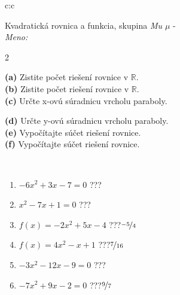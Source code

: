 \documentclass[10pt]{report}
\begin{document}
\begin{tabular}{c:c}
\begin{minipage}[c][104.5mm][t]{0.5\linewidth}
\begin{center}
\vspace{7mm}
{\huge {\LARGE Kvadratická rovnica a funkcia}, skupina \textit{Mu $\mu$} -}\\[5mm]
\textit{Meno:}\phantom{xxxxxxxxxxxxxxxxxxxxxxxxxxxxxxxxxxxxxxxxxxxxxxxxxxxxxxxxxxxxxxxxx}\\[5mm]
\begin{minipage}{0.95\linewidth}
\begin{center}
{\small \begin{multicols}{2} \raggedright
\textbf{(a)} Zistite počet riešení rovnice v \(\mathbb{R}\). \\[1mm]
\textbf{(b)} Zistite počet riešení rovnice v \(\mathbb{R}\). \\[1mm]
\textbf{(c)} Určte x-ovú súradnicu vrcholu paraboly. \par \columnbreak
\textbf{(d)} Určte y-ovú súradnicu vrcholu paraboly. \\[1mm]
\textbf{(e)} Vypočítajte súčet riešení rovnice. \\[1mm]
\textbf{(f)} Vypočítajte súčet riešení rovnice.
\end{multicols}
}
\end{center}
\end{minipage}
\\[4mm]
\begin{minipage}{0.79\linewidth}
\begin{center}
\begin{varwidth}{\linewidth}
\begin{enumerate}
\Large
\item $-6x^2+3x-7=0$\quad \dotfill\; ???\;\dotfill {}
\item $x^2-7x+1=0$\quad \dotfill\; ???\;\dotfill {}
\item $f(x)=-2x^2+5x-4$\quad \dotfill\; ???\;\dotfill \quad $\nicefrac{-5}{4}$
\item $f(x)=4x^2-x+1$\quad \dotfill\; ???\;\dotfill \quad $\nicefrac{7}{16}$
\item $-3x^2-12x-9=0$\quad \dotfill\; ???\;\dotfill {}
\item $-7x^2+9x-2=0$\quad \dotfill\; ???\;\dotfill \quad $\nicefrac{9}{7}$
\end{enumerate}
\end{varwidth}
\end{center}

\end{minipage}
\end{center}
\end{minipage}
\end{tabular}
\end{document}
